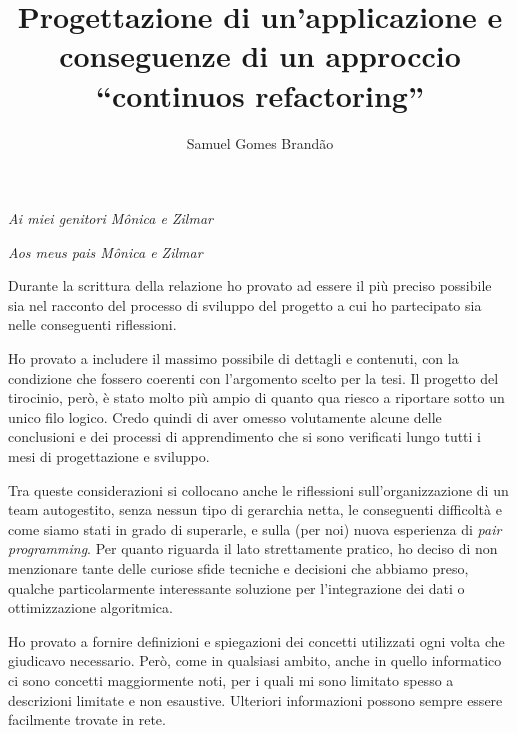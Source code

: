 \documentclass[12pt]{report}
\begin{document}
\renewcommand{\baselinestretch}{1.3}
\title{Progettazione di un'applicazione e conseguenze di un approccio
``continuos refactoring''}

\author{Samuel Gomes Brandão}

\beforepreface
{}
        {\hfill \Large {\sl Ai miei genitori Mônica e Zilmar}}

        {\hfill \Large {\sl Aos meus pais Mônica e Zilmar}}
% 
%

Durante la scrittura della relazione ho provato ad essere il più preciso 
possibile sia nel racconto del processo di sviluppo del progetto 
a cui ho partecipato sia nelle conseguenti riflessioni.

Ho provato a includere il massimo possibile di dettagli e contenuti, 
con la condizione che fossero coerenti con l'argomento scelto per 
la tesi. Il progetto del tirocinio, però, è stato molto più ampio di 
quanto qua riesco a riportare sotto un unico filo logico. 
Credo quindi di aver omesso volutamente alcune delle conclusioni e 
dei processi di apprendimento che si sono verificati lungo tutti 
i mesi di progettazione e sviluppo.

Tra queste considerazioni si collocano anche le riflessioni 
sull'organizzazione di 
un team autogestito, senza nessun tipo di gerarchia netta, le 
conseguenti difficoltà e come siamo stati in grado di superarle, 
e sulla (per noi) nuova esperienza di \textit{pair programming}. 
Per quanto riguarda il lato strettamente pratico, 
ho deciso di non menzionare tante delle curiose sfide
tecniche e decisioni che abbiamo preso, qualche particolarmente 
interessante soluzione per l'integrazione dei dati o 
ottimizzazione algoritmica.

Ho provato a fornire definizioni e spiegazioni dei concetti utilizzati ogni volta
che giudicavo necessario. Però, come in qualsiasi ambito, anche in quello informatico 
ci sono concetti maggiormente noti, per i quali mi sono limitato spesso a
descrizioni limitate e non esaustive. Ulteriori informazioni possono sempre
essere facilmente trovate in rete. %
\end{document}
